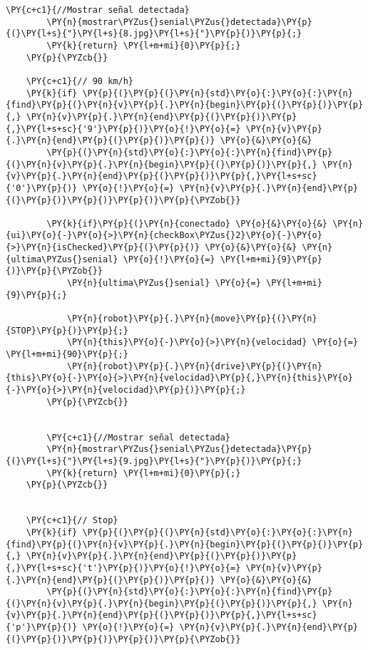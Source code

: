 \begin{Verbatim}[commandchars=\\\{\}]
        \PY{c+c1}{//Mostrar señal detectada}
        \PY{n}{mostrar\PYZus{}senial\PYZus{}detectada}\PY{p}{(}\PY{l+s}{"}\PY{l+s}{8.jpg}\PY{l+s}{"}\PY{p}{)}\PY{p}{;}
        \PY{k}{return} \PY{l+m+mi}{0}\PY{p}{;}
    \PY{p}{\PYZcb{}}

    \PY{c+c1}{// 90 km/h}
    \PY{k}{if} \PY{p}{(}\PY{p}{(}\PY{n}{std}\PY{o}{:}\PY{o}{:}\PY{n}{find}\PY{p}{(}\PY{n}{v}\PY{p}{.}\PY{n}{begin}\PY{p}{(}\PY{p}{)}\PY{p}{,} \PY{n}{v}\PY{p}{.}\PY{n}{end}\PY{p}{(}\PY{p}{)}\PY{p}{,}\PY{l+s+sc}{'9'}\PY{p}{)}\PY{o}{!}\PY{o}{=} \PY{n}{v}\PY{p}{.}\PY{n}{end}\PY{p}{(}\PY{p}{)}\PY{p}{)} \PY{o}{&}\PY{o}{&} 
        \PY{p}{(}\PY{n}{std}\PY{o}{:}\PY{o}{:}\PY{n}{find}\PY{p}{(}\PY{n}{v}\PY{p}{.}\PY{n}{begin}\PY{p}{(}\PY{p}{)}\PY{p}{,} \PY{n}{v}\PY{p}{.}\PY{n}{end}\PY{p}{(}\PY{p}{)}\PY{p}{,}\PY{l+s+sc}{'0'}\PY{p}{)} \PY{o}{!}\PY{o}{=} \PY{n}{v}\PY{p}{.}\PY{n}{end}\PY{p}{(}\PY{p}{)}\PY{p}{)}\PY{p}{)}\PY{p}{\PYZob{}}

        \PY{k}{if}\PY{p}{(}\PY{n}{conectado} \PY{o}{&}\PY{o}{&} \PY{n}{ui}\PY{o}{-}\PY{o}{>}\PY{n}{checkBox\PYZus{}2}\PY{o}{-}\PY{o}{>}\PY{n}{isChecked}\PY{p}{(}\PY{p}{)} \PY{o}{&}\PY{o}{&} \PY{n}{ultima\PYZus{}senial} \PY{o}{!}\PY{o}{=} \PY{l+m+mi}{9}\PY{p}{)}\PY{p}{\PYZob{}}
            \PY{n}{ultima\PYZus{}senial} \PY{o}{=} \PY{l+m+mi}{9}\PY{p}{;}

            \PY{n}{robot}\PY{p}{.}\PY{n}{move}\PY{p}{(}\PY{n}{STOP}\PY{p}{)}\PY{p}{;}
            \PY{n}{this}\PY{o}{-}\PY{o}{>}\PY{n}{velocidad} \PY{o}{=} \PY{l+m+mi}{90}\PY{p}{;}
            \PY{n}{robot}\PY{p}{.}\PY{n}{drive}\PY{p}{(}\PY{n}{this}\PY{o}{-}\PY{o}{>}\PY{n}{velocidad}\PY{p}{,}\PY{n}{this}\PY{o}{-}\PY{o}{>}\PY{n}{velocidad}\PY{p}{)}\PY{p}{;}
        \PY{p}{\PYZcb{}}


        \PY{c+c1}{//Mostrar señal detectada}
        \PY{n}{mostrar\PYZus{}senial\PYZus{}detectada}\PY{p}{(}\PY{l+s}{"}\PY{l+s}{9.jpg}\PY{l+s}{"}\PY{p}{)}\PY{p}{;}
        \PY{k}{return} \PY{l+m+mi}{0}\PY{p}{;}
    \PY{p}{\PYZcb{}}


    \PY{c+c1}{// Stop}
    \PY{k}{if} \PY{p}{(}\PY{p}{(}\PY{n}{std}\PY{o}{:}\PY{o}{:}\PY{n}{find}\PY{p}{(}\PY{n}{v}\PY{p}{.}\PY{n}{begin}\PY{p}{(}\PY{p}{)}\PY{p}{,} \PY{n}{v}\PY{p}{.}\PY{n}{end}\PY{p}{(}\PY{p}{)}\PY{p}{,}\PY{l+s+sc}{'t'}\PY{p}{)}\PY{o}{!}\PY{o}{=} \PY{n}{v}\PY{p}{.}\PY{n}{end}\PY{p}{(}\PY{p}{)}\PY{p}{)} \PY{o}{&}\PY{o}{&} 
        \PY{p}{(}\PY{n}{std}\PY{o}{:}\PY{o}{:}\PY{n}{find}\PY{p}{(}\PY{n}{v}\PY{p}{.}\PY{n}{begin}\PY{p}{(}\PY{p}{)}\PY{p}{,} \PY{n}{v}\PY{p}{.}\PY{n}{end}\PY{p}{(}\PY{p}{)}\PY{p}{,}\PY{l+s+sc}{'p'}\PY{p}{)} \PY{o}{!}\PY{o}{=} \PY{n}{v}\PY{p}{.}\PY{n}{end}\PY{p}{(}\PY{p}{)}\PY{p}{)}\PY{p}{)}\PY{p}{\PYZob{}}


\end{Verbatim}
